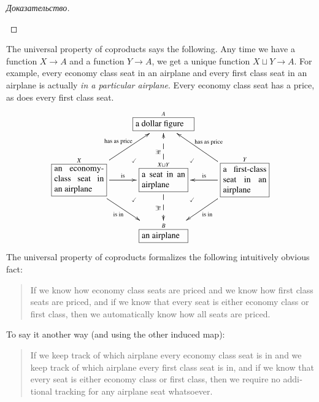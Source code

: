 \documentclass[a4paper]{book}
\def\tn{\textnormal}
\def\to{\rightarrow}
\newcommand{\LA}[2]{\ar[#1]^-{\tn {#2}}}
\newcommand{\LAL}[2]{\ar[#1]_-{\tn {#2}}}
\newcommand{\obox}[3]{\stackrel{#1}{\fbox{\parbox{#2}{#3}}}}
\theoremstyle{myth}
\newtheorem{exampleENG}[envENG]{\begin{english}Example\end{english}}
\newtheorem{exampleRUS}[envRUS]{\begin{russian}Пример\end{russian}}
\newenvironment{proofRUS}{\begin{proof}[Доказательство]}{\end{proof}}
\begin{document}
\begin{english}
\begin{proofRUS}
\begin{russian} \end{russian}
\end{proofRUS}

\begin{exampleENG}
The universal property of coproducts says the following. Any time we have a function $X\to A$ and a function $Y\to A$, we get a unique function $X\sqcup Y\to A$. For example, every economy class seat in an airplane and every first class seat in an airplane is actually {\em in a particular airplane}. Every economy class seat has a price, as does every first class seat.
\begin{align}
\xymatrix{
&\obox{A}{.9in}{a dollar figure}&\\
\obox{X}{.8in}{an economy-class seat in an airplane}\LA{ru}{has as price}\LA{r}{is}\LAL{dr}{is in}&\obox{X\sqcup Y}{.7in}{a seat in an airplane}\ar@{-->}[d]_{\exists!}\ar@{-->}[u]^{\exists!}\ar@{}[ur]|(.35){\checkmark}\ar@{}[dl]|(.35){\checkmark}\ar@{}[dr]|(.35){\checkmark}\ar@{}[ul]|(.35){\checkmark}&\obox{Y}{.7in}{a first-class seat in an airplane}\LAL{l}{is}\LAL{lu}{has as price}\LA{dl}{is in}\\
&\obox{B}{.7in}{an airplane}&
}
\end{align}
The universal property of coproducts formalizes the following intuitively obvious fact:
\begin{quote}
If we know how economy class seats are priced and we know how first class seats are priced, and if we know that every seat is either economy class or first class, then we automatically know how all seats are priced.
\end{quote}
To say it another way (and using the other induced map):
\begin{quote}
If we keep track of which airplane every economy class seat is in and we keep track of which airplane every first class seat is in, and if we know that every seat is either economy class or first class, then we require no additional tracking for any airplane seat whatsoever.
\end{quote}
\end{exampleENG}

\begin{exampleRUS}
\begin{russian} \end{russian}
\end{exampleRUS}


\end{english}
\end{document}
